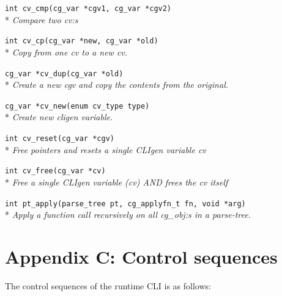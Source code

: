 \documentclass[a4paper, 10pt] {article}
\begin{document}
{{\tt int cv\_cmp(cg\_var *cgv1, cg\_var *cgv2)}\\*
\emph{ Compare two cv:s}

{\tt int cv\_cp(cg\_var *new, cg\_var *old)}\\*
\emph{ Copy from one cv to a new cv.}

{\tt cg\_var *cv\_dup(cg\_var *old)}\\*
\emph{ Create a new cgv and copy the contents from the original. }

{\tt cg\_var *cv\_new(enum cv\_type type)}\\*
\emph{ Create new cligen variable. }

{\tt int cv\_reset(cg\_var *cgv)}\\*
\emph{ Free pointers and resets a single CLIgen variable cv}

{\tt int cv\_free(cg\_var *cv)}\\*
\emph{ Free a single CLIgen variable (cv) AND frees the cv itself}

{\tt int pt\_apply(parse\_tree pt, cg\_applyfn\_t fn, void *arg)}\\*
\emph{ Apply a function call recursively on all cg\_obj:s in a parse-tree.}

\normalsize


\newpage
\section*{Appendix C: Control sequences}
\label{app:control}
The control sequences of the runtime CLI is as follows:


}
\end{document}
